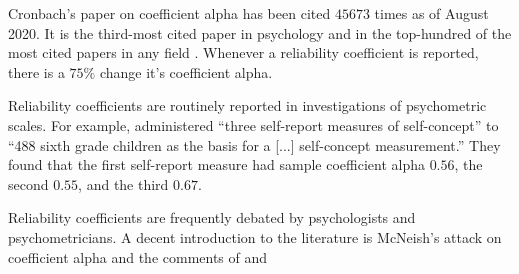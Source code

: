 Cronbach's \citeyear{Cronbach1951-in} paper on coefficient alpha has been cited $45673$ times as of August 2020. It is the third-most cited paper in psychology and in the top-hundred of the most cited papers in any field \parencite{McNeish2018-vu}. Whenever a reliability coefficient is reported, there is a $75\%$ change it's coefficient alpha.

Reliability coefficients are routinely reported in investigations of psychometric scales. For example, \textcite{Marx1978-rf} administered \enquote{three self-report measures of self-concept} to \enquote{488 sixth grade children as the basis for a [...] self-concept measurement.} They found that the first self-report measure had sample coefficient alpha $0.56$, the second $0.55$, and the third $0.67$. 

Reliability coefficients are frequently debated by psychologists and psychometricians. A decent introduction to the literature is McNeish's \citeyear{McNeish2018-vu} attack on coefficient alpha and the comments of \textcite{Raykov2019-yr} and %


